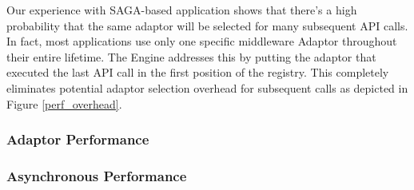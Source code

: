 Our experience with SAGA-based application shows that there’s a high probability that the same adaptor will be selected for many subsequent API calls. In fact, most applications use only one specific middleware Adaptor throughout their entire lifetime. The Engine addresses this by putting the adaptor that executed the last API call in the first position of the registry. This completely eliminates potential adaptor selection overhead for subsequent calls as depicted in Figure \ref{perf_overhead}. 




\subsubsection{Adaptor Performance}\label{perf_adaptors}

\subsubsection{Asynchronous Performance}\label{perf_async}

